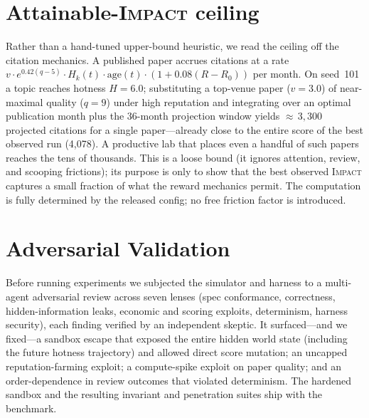 \documentclass[11pt]{article}
\newcommand{\impact}{\textsc{Impact}}
\begin{document}
\appendix
\section{Attainable-\impact{} ceiling}
\label{app:ceiling}
Rather than a hand-tuned upper-bound heuristic, we read the ceiling off the citation mechanics. A
published paper accrues citations at a rate
$v \cdot e^{0.42(q-5)} \cdot H_k(t) \cdot \mathrm{age}(t) \cdot (1 + 0.08(R-R_0))$ per month. On
seed~101 a topic reaches hotness $H=6.0$; substituting a top-venue paper ($v=3.0$) of near-maximal
quality ($q=9$) under high reputation and integrating over an optimal publication month plus the
36-month projection window yields ${\approx}\,3{,}300$ projected citations for a single
paper---already close to the entire score of the best observed run (4{,}078). A productive lab that
places even a handful of such papers reaches the tens of thousands. This is a loose bound (it
ignores attention, review, and scooping frictions); its purpose is only to show that the best
observed \impact{} captures a small fraction of what the reward mechanics permit. The computation is
fully determined by the released config; no free friction factor is introduced.

\section{Adversarial Validation}
Before running experiments we subjected the simulator and harness to a multi-agent adversarial
review across seven lenses (spec conformance, correctness, hidden-information leaks, economic and
scoring exploits, determinism, harness security), each finding verified by an independent skeptic.
It surfaced---and we fixed---a sandbox escape that exposed the entire hidden world state (including
the future hotness trajectory) and allowed direct score mutation; an uncapped reputation-farming
exploit; a compute-spike exploit on paper quality; and an order-dependence in review outcomes that
violated determinism. The hardened sandbox and the resulting invariant and penetration suites ship
with the benchmark.



\end{document}
